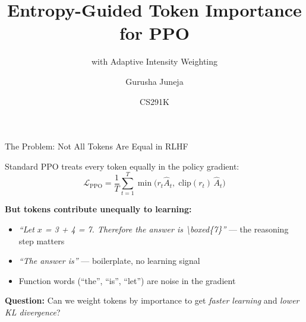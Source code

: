 \documentclass[aspectratio=169,10pt]{beamer}
\title{Entropy-Guided Token Importance for PPO}
\subtitle{with Adaptive Intensity Weighting}
\author{Gurusha Juneja}
\date{CS291K}
\begin{document}
\maketitle

\begin{frame}{The Problem: Not All Tokens Are Equal in RLHF}

Standard PPO treats every token equally in the policy gradient:
\[
\mathcal{L}_{\text{PPO}} = \frac{1}{T}\sum_{t=1}^{T} \min\!\bigl(r_t \hat{A}_t,\; \text{clip}(r_t)\,\hat{A}_t\bigr)
\]

\textbf{But tokens contribute unequally to learning:}
\begin{itemize}
    \item \textit{``Let $x$ = \alert{3 + 4 = 7}. Therefore the answer is \alert{\textbackslash boxed\{7\}}''} --- the reasoning step matters
    \item \textit{``The answer is''} --- boilerplate, no learning signal
    \item Function words (``the'', ``is'', ``let'') are noise in the gradient
\end{itemize}

\vspace{0.3cm}
\textbf{Question:} Can we weight tokens by importance to get \textit{faster learning} and \textit{lower KL divergence}?

\end{frame}
\end{document}
